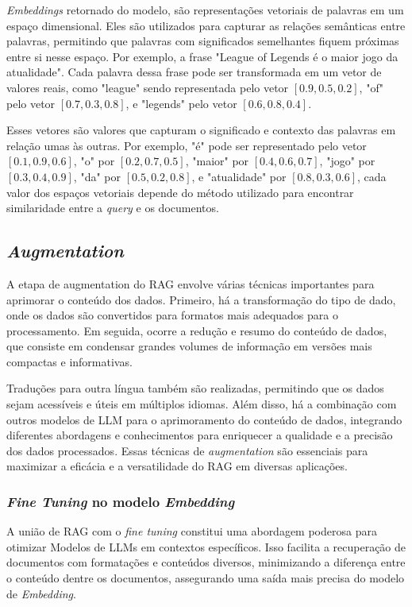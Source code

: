 \textit{Embeddings} retornado do modelo, são representações vetoriais de palavras em um espaço dimensional. Eles são utilizados para capturar as relações semânticas entre palavras, permitindo que palavras com significados semelhantes fiquem próximas entre si nesse espaço. Por exemplo, a frase "League of Legends é o maior jogo da atualidade". Cada palavra dessa frase pode ser transformada em um vetor de valores reais, como "league" sendo representada pelo vetor \([0.9, 0.5, 0.2]\), "of" pelo vetor \([0.7, 0.3, 0.8]\), e "legends" pelo vetor \([0.6, 0.8, 0.4]\).

Esses vetores são valores que capturam o significado e contexto das palavras em relação umas às outras. Por exemplo, "é" pode ser representado pelo vetor \([0.1, 0.9, 0.6]\), "o" por \([0.2, 0.7, 0.5]\), "maior" por \([0.4, 0.6, 0.7]\), "jogo" por \([0.3, 0.4, 0.9]\), "da" por \([0.5, 0.2, 0.8]\), e "atualidade" por \([0.8, 0.3, 0.6]\), cada valor dos espaços vetoriais depende do método utilizado para encontrar similaridade entre a \textit{query} e os documentos.

\subsection{\textit{Augmentation}}

A etapa de augmentation do RAG  envolve várias técnicas importantes para aprimorar o conteúdo dos dados. Primeiro, há a transformação do tipo de dado, onde os dados são convertidos para formatos mais adequados para o processamento. Em seguida, ocorre a redução e resumo do conteúdo de dados, que consiste em condensar grandes volumes de informação em versões mais compactas e informativas. 

Traduções para outra língua também são realizadas, permitindo que os dados sejam acessíveis e úteis em múltiplos idiomas. Além disso, há a combinação com outros modelos de LLM  para o aprimoramento do conteúdo de dados, integrando diferentes abordagens e conhecimentos para enriquecer a qualidade e a precisão dos dados processados. Essas técnicas de \textit{augmentation} são essenciais para maximizar a eficácia e a versatilidade do RAG em diversas aplicações.

\subsubsection{\textit{Fine Tuning} no modelo \textit{Embedding}}

A união de RAG com o \textit{fine tuning} constitui uma abordagem poderosa para otimizar Modelos de  LLMs em contextos específicos. Isso facilita a recuperação de documentos com formatações e conteúdos diversos, minimizando a diferença entre o conteúdo dentre os documentos, assegurando uma saída mais precisa do modelo de \textit{Embedding}. 

